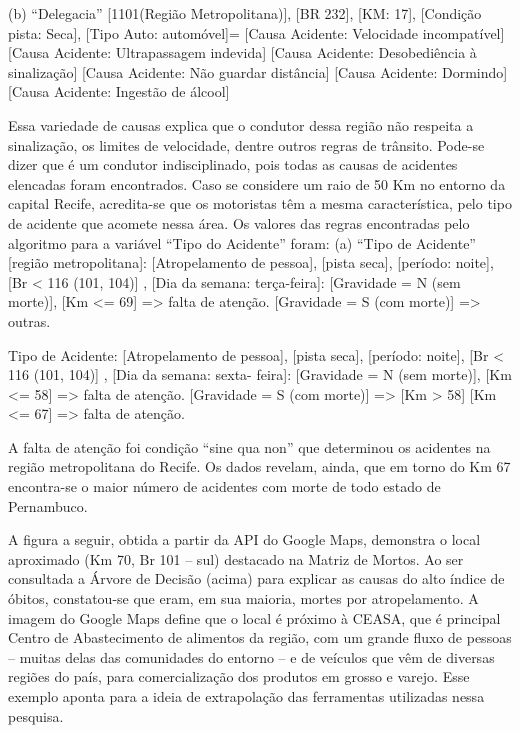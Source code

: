 (b) “Delegacia” [1101(Região Metropolitana)], [BR 232],
[KM: 17], [Condição pista: Seca], [Tipo Auto: automóvel]=
[Causa Acidente: Velocidade incompatível]
[Causa Acidente: Ultrapassagem indevida]
[Causa Acidente: Desobediência à sinalização]
[Causa Acidente: Não guardar distância]
[Causa Acidente: Dormindo]
[Causa Acidente: Ingestão de álcool]

Essa variedade de causas explica que o condutor dessa
região não respeita a sinalização, os limites de velocidade, dentre outros regras de trânsito. Pode-se dizer que é um condutor
indisciplinado, pois todas as causas de acidentes elencadas foram encontrados.
Caso se considere um raio de 50 Km no entorno da capital Recife, acredita-se que os motoristas têm a mesma
característica, pelo tipo de acidente que acomete nessa área.
Os valores das regras encontradas pelo algoritmo para a
variável “Tipo do Acidente” foram:
(a) “Tipo de Acidente” [região metropolitana]: [Atropelamento
de pessoa], [pista seca], [período: noite], [Br < 116 (101, 104)]
, [Dia da semana: terça-feira]:
[Gravidade = N (sem morte)], [Km <= 69] => falta de atenção.
[Gravidade = S (com morte)] => outras.

Tipo de Acidente: [Atropelamento de pessoa], [pista seca],
[período: noite], [Br < 116 (101, 104)] , [Dia da semana: sexta-
feira]:
[Gravidade = N (sem morte)], [Km <= 58] => falta de atenção.
[Gravidade = S (com morte)] => [Km > 58] [Km <= 67] =>
falta de atenção.

\vspace{5mm}

A falta de atenção foi condição ``sine qua non'' que determinou os acidentes na região metropolitana do Recife. Os dados revelam, ainda, que em torno do Km 67 encontra-se o maior número de acidentes com morte de todo estado de Pernambuco.

\vspace{5mm}

A figura a seguir, obtida a partir da API do Google Maps, demonstra o local aproximado (Km 70, Br 101 -- sul) destacado na Matriz de Mortos. Ao ser consultada a Árvore de Decisão (acima) para explicar as causas do alto índice de óbitos, constatou-se que eram, em sua maioria, mortes por atropelamento. A imagem do Google Maps define que o local é próximo à CEASA, que é principal Centro de Abastecimento de alimentos da região, com um grande fluxo de pessoas -- muitas delas das comunidades do entorno -- e de veículos que vêm de diversas regiões do país, para comercialização dos produtos em grosso e varejo. Esse exemplo aponta para a ideia de extrapolação das ferramentas utilizadas nessa pesquisa.  

